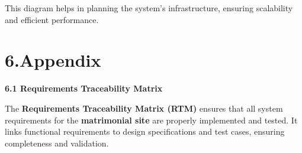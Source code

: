 This diagram helps in planning the system's infrastructure, ensuring
scalability and efficient performance.

\section{}\label{section-5}

\section{\texorpdfstring{6.Appendix }{6.Appendix }}\label{appendix}

\textbf{6.1 Requirements Traceability Matrix}

The \textbf{Requirements Traceability Matrix (RTM)} ensures that all
system requirements for the \textbf{matrimonial site} are properly
implemented and tested. It links functional requirements to design
specifications and test cases, ensuring completeness and validation.

